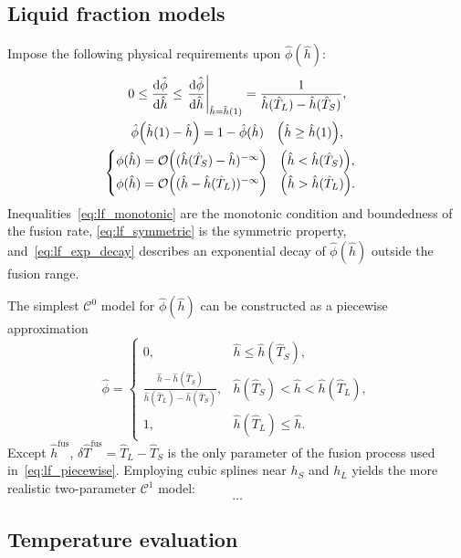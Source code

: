 \documentclass{article}
\newcommand{\fusion}[1]{{#1}^\mathrm{fus}}
\newcommand{\Hh}{\hat{h}}
\newcommand{\HT}{\hat{T}}
\newcommand{\Hphi}{\hat{\phi}}
\begin{document}
\subsection{Liquid fraction models}

Impose the following physical requirements upon \(\hat\phi(\Hh)\):
\begin{gather}
    0 \leq \dv{\hat\phi}{\Hh} \leq \eval{\dv{\hat\phi}{\Hh}}_{\Hh=\Hh(1)} =
        \frac1{\Hh(\HT_L)-\Hh(\HT_S)}, \label{eq:lf_monotonic}\\
    \hat\phi\qty(\Hh(1) - \Hh) = 1 - \hat\phi(\Hh) \quad \qty(\Hh\geq\Hh(1)), \label{eq:lf_symmetric}\\
    \begin{cases}
	\phi(\Hh) = \order{(\Hh(\HT_S)-\Hh)^{-\infty}} \quad \qty(\Hh < \Hh(\HT_S)), \\
	    \phi(\Hh) = \order{(\Hh-\Hh(\HT_L))^{-\infty}} \quad \qty(\Hh > \Hh(\HT_L)).
	\end{cases}\label{eq:lf_exp_decay}
\end{gather}
Inequalities~\eqref{eq:lf_monotonic} are the monotonic condition and boundedness of the fusion rate,
\eqref{eq:lf_symmetric} is the symmetric property,
and~\eqref{eq:lf_exp_decay} describes an exponential decay of \(\hat\phi(\Hh)\) outside the fusion range.

The simplest \(\mathcal{C}^0\) model for \(\Hphi(\Hh)\) can be constructed as a piecewise approximation
\begin{equation}\label{eq:lf_piecewise}
	\Hphi = \begin{cases}
        0,                                            & \Hh \leq \Hh(\HT_S), \\
        \frac{\Hh-\Hh(\HT_S)}{\Hh(\HT_L)-\Hh(\HT_S)}, & \Hh(\HT_S) < \Hh < \Hh(\HT_L), \\
        1,                                            & \Hh(\HT_L) \leq \Hh.
    \end{cases}
\end{equation}
Except \(\fusion{\Hh}\), \(\delta\fusion{\HT} = \HT_L - \HT_S\)
is the only parameter of the fusion process  used in~\eqref{eq:lf_piecewise}.
Employing cubic splines near \(h_S\) and \(h_L\) yields the more realistic two-parameter \(\mathcal{C}^1\) model:
\begin{equation}\label{eq:lf_splines}
	\dots
\end{equation}

\subsection{Temperature evaluation}
\end{document}
